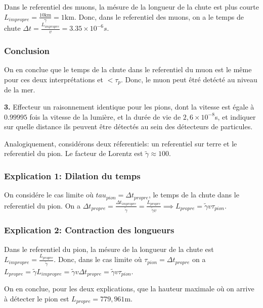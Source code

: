 \documentclass[french]{article}
\begin{document}
	Dans le referentiel des muons, la mésure de la longueur de la chute est plus courte $L_{impropre} = \frac{10 \mathrm{km}}{\gamma} = 1 \mathrm{km}$.	Donc, dans le referentiel des muons, on a le temps de chute $\Delta t = \frac{L_{impropre}}{v} = 3.35 \times 10^{-6}s$.
	
	\subsubsection*{Conclusion}
	
	On en conclue que le temps de la chute dans le referentiel du muon est le même pour ces deux interprétations et $< \tau_p$. Donc, le muon peut êtré detécté au niveau de la mer.

	\begin{tcolorbox}[colback=gray!5!white,colframe=gray!75!black]
		\textbf{3.} Effecteur un raisonnement identique pour les pions, dont la vitesse est égale à $0.99995$ fois la vitesse de la lumière, et la durée de vie de $2,6 \times 10^{-8}$s, et indiquer sur quelle distance ils peuvent être détectés au sein des détecteurs de particules.
	\end{tcolorbox}

	Analogiquement, considérons deux réferentiels: un referentiel sur terre et le referentiel du pion. Le facteur de Lorentz est $\tilde{\gamma} \approx 100$. 
	
	\subsubsection*{Explication 1: Dilation du temps}
	
	On considére le cas limite où $tau_{pion} = \Delta t_{propre}$, le temps de la chute dans le referentiel du pion. On a $\Delta t_{propre} = \frac{\Delta t_{impropre}}{\tilde{\gamma}} = \frac{L_{propre}}{\tilde{\gamma}v} \implies L_{propre} = \tilde{\gamma}v\tau_{pion}$.
	
	\subsubsection*{Explication 2: Contraction des longueurs}
	
	Dans le referentiel du pion, la mésure de la longueur de la chute est $L_{impropre} = \frac{L_{propre}}{\tilde{\gamma}}$.	Donc, dans le cas limite où $\tau_{pion} = \Delta t_{propre}$ on a $L_{propre} = \tilde{\gamma}L_{impropre} = \tilde{\gamma}v\Delta t_{propre}= \tilde{\gamma}v\tau_{pion}$.
	
	On en conclue, pour les deux explications, que la hauteur maximale où on arrive à détecter le pion est $L_{propre} = 779,961\mathrm{m}$.
	
	
\end{document}
